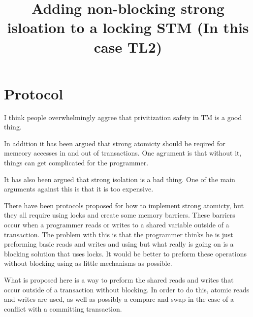\documentclass[11pt]{article}
\begin{document}
\newenvironment{theorem-repeat}[1]{\begin{trivlist}
\item[\hspace{\labelsep}{\bf\noindent Theorem~\ref{#1} }]}%
{\end{trivlist}}

\newenvironment{corollary-repeat}[1]{\begin{trivlist}
\item[\hspace{\labelsep}{\bf\noindent Corollary~\ref{#1} }]}%
{\end{trivlist}}


\newcommand{\Xomit}[1]{}

\title{Adding non-blocking strong isloation to a locking STM (In this case TL2)}

\section{Protocol}
I think people overwhelmingly aggree that privitization safety in TM is a good thing.

In addition it has been argued that strong atomicty should be reqired for memeory accesses in and out of transactions.
One agrument is that without it, things can get complicated for the programmer.

It has also been argued that strong isolation is a bad thing.
One of the main arguments against this is that it is too expensive.

There have been protocols proposed for how to implement strong atomicty, but they all require using locks
and create some memory barriers.
These barriers occur when a programmer reads or writes to a shared variable outside of a transaction.
The problem with this is that the programmer thinks he is just preforming basic reads and writes and using
but what really is going on is a blocking solution that uses locks.
It would be better to preform these operations without blocking using as little mechanisms as possible.

What is proposed here is a way to preform the shared reads and writes that occur outside of a transaction
without blocking.
In order to do this, atomic reads and writes are used, as well as possibly a compare and swap in the case
of a conflict with a committing transaction.
\end{document}
